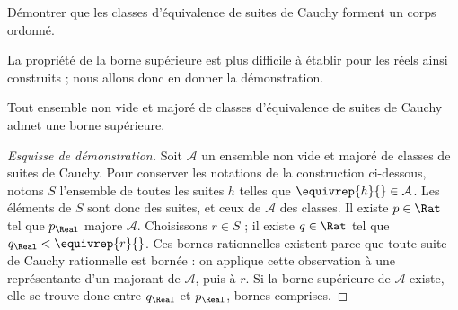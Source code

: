 \documentclass[11pt,a4paper,openany]{memoir}
\begin{document}
\begin{prob}
Démontrer que les classes d'équivalence de suites de Cauchy forment
un corps ordonné.
\end{prob}

La propriété de la borne supérieure est plus difficile à établir pour
les réels ainsi construits ; nous allons donc en donner la démonstration.

\begin{thm}
Tout ensemble non vide et majoré de classes d'équivalence de suites
de Cauchy admet une borne supérieure.
\end{thm}

\begin{proof}[Esquisse de démonstration]
Soit $\mathcal A$ un ensemble non vide et majoré de classes de suites
de Cauchy. Pour conserver les notations de la construction ci-dessous,
notons $S$ l'ensemble de toutes les suites $h$ telles que
$\equivrep{h}{}\in\mathcal A$. Les éléments de $S$ sont donc des suites,
et ceux de $\mathcal A$ des classes. Il existe $p\in\Rat$ tel que
$p_\Real$ majore $\mathcal A$. Choisissons $r\in S$ ; il existe
$q\in\Rat$ tel que $q_\Real<\equivrep{r}{}$. Ces bornes rationnelles
existent parce que toute suite de Cauchy rationnelle est bornée :
on applique cette observation à une représentante d'un majorant
de $\mathcal A$, puis à $r$. Si la borne supérieure de $\mathcal A$
existe, elle se trouve donc entre $q_\Real$ et $p_\Real$, bornes comprises.


\end{proof}
\end{document}
